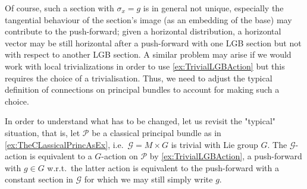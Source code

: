 \documentclass[reqno,a4paper,oneside]{amsart}
\theoremstyle{plain}
\theoremstyle{remark}
\theoremstyle{definition}
\begin{document}
\begin{center}
\end{center}

Of course, such a section with $\sigma_x= g$ is in general not unique, especially the tangential behaviour of the section's image (as an embedding of the base) may contribute to the push-forward; given a horizontal distribution, a horizontal vector may be still horizontal after a push-forward with one LGB section but not with respect to another LGB section. A similar problem may arise if we would work with local trivializations in order to use \ref{ex:TrivialLGBAction} but this requires the choice of a trivialisation. Thus, we need to adjust the typical definition of connections on principal bundles to account for making such a choice.

In order to understand what has to be changed, let us revisit the "typical" situation, that is, let $\mathcal{P}$ be a classical principal bundle as in \ref{ex:TheCLassicalPrincAsEx}, i.e.\ $\mathcal{G} = M \times G$ is trivial with Lie group $G$. The $\mathcal{G}$-action is equivalent to a $G$-action on $\mathcal{P}$ by \ref{ex:TrivialLGBAction}, a push-forward with $g \in G$ w.r.t.\ the latter action is equivalent to the push-forward with a constant section in $\mathcal{G}$ for which we may still simply write $g$.
\end{document}
